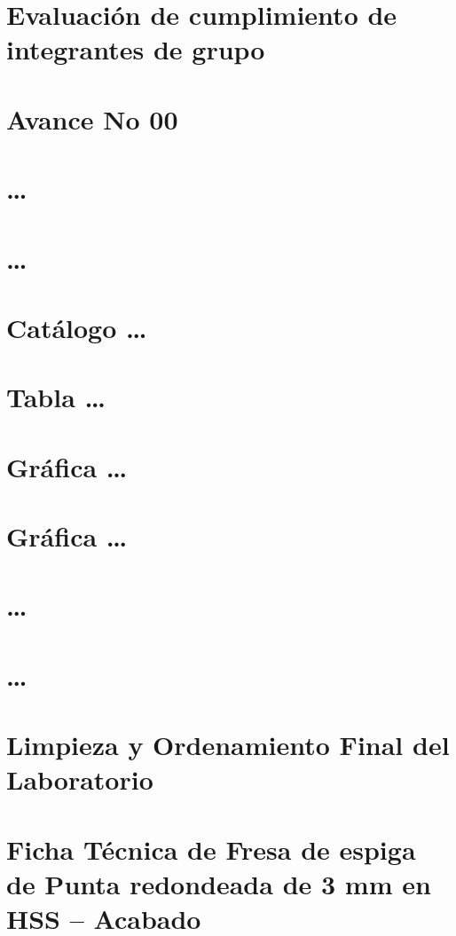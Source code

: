 \section{Evaluación de cumplimiento de integrantes de grupo}

\section{Avance No 00}

\section{\ldots}

\section{\ldots}

\section{Catálogo \ldots}

\section{Tabla \ldots}

\section{Gráfica \ldots}

\section{Gráfica \ldots}

\section{\ldots}

\section{\ldots}

\section{Limpieza y Ordenamiento Final del Laboratorio}

\section{Ficha Técnica de Fresa de espiga de Punta redondeada de 3 mm en HSS -- Acabado}

